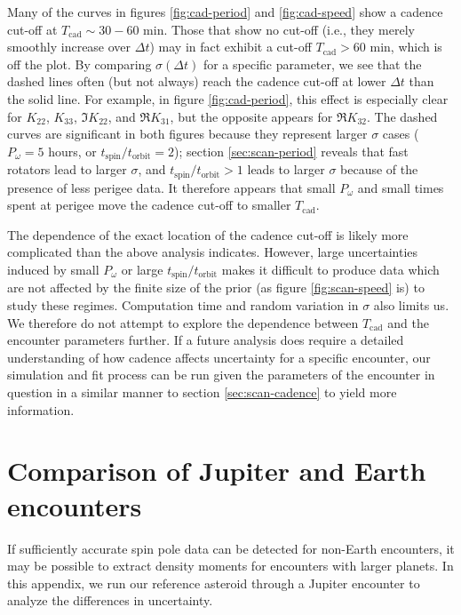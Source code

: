 \documentclass[fleqn,usenatbib]{mnras}
\begin{document}
Many of the curves in figures \ref{fig:cad-period} and \ref{fig:cad-speed} show a cadence cut-off at $T_\text{cad} \sim 30-60$ min. Those that show no cut-off (i.e., they merely smoothly increase over $\Delta t$) may in fact exhibit a cut-off $T_\text{cad} > 60$ min, which is off the plot. By comparing $\sigma(\Delta t)$ for a specific parameter, we see that the dashed lines often (but not always) reach the cadence cut-off at lower $\Delta t$ than the solid line. For example, in figure \ref{fig:cad-period}, this effect is especially clear for $K_{22}$, $K_{33}$, $\Im K_{22}$, and $\Re K_{31}$, but the opposite appears for $\Re K_{32}$. The dashed curves are significant in both figures because they represent larger $\sigma$ cases ($P_\omega=5$ hours, or $t_\text{spin}/t_\text{orbit}=2$); section \ref{sec:scan-period} reveals that fast rotators lead to larger $\sigma$, and $t_\text{spin}/t_\text{orbit} > 1$ leads to larger $\sigma$ because of the presence of less perigee data. It therefore appears that small $P_\omega$ and small times spent at perigee move the cadence cut-off to smaller $T_\text{cad}$.

The dependence of the exact location of the cadence cut-off is likely more complicated than the above analysis indicates. However, large uncertainties induced by small $P_\omega$ or large $t_\text{spin}/t_\text{orbit}$ makes it difficult to produce data which are not affected by the finite size of the prior (as figure \ref{fig:scan-speed} is) to study these regimes. Computation time and random variation in $\sigma$ also limits us. We therefore do not attempt to explore the dependence between $T_\text{cad}$ and the encounter parameters further. If a future analysis does require a detailed understanding of how cadence affects uncertainty for a specific encounter, our simulation and fit process can be run given the parameters of the encounter in question in a similar manner to section \ref{sec:scan-cadence} to yield more information. 


\section{Comparison of Jupiter and Earth encounters}
\label{app:jupiter-earth}

If sufficiently accurate spin pole data can be detected for non-Earth encounters, it may be possible to extract density moments for encounters with larger planets. In this appendix, we run our reference asteroid through a Jupiter encounter to analyze the differences in uncertainty.
\end{document}
